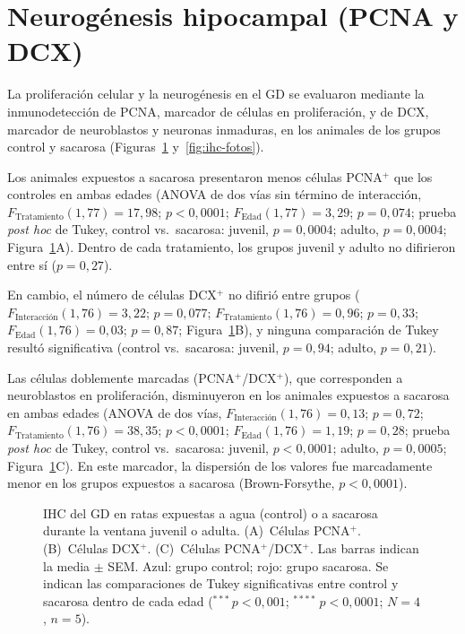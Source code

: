 \FloatBarrier
\section{Neurogénesis hipocampal (PCNA y DCX)}\label{sec:res-neurogenesis}

La proliferación celular y la neurogénesis en el GD se evaluaron mediante la inmunodetección de PCNA, marcador de células en proliferación, y de DCX, marcador de neuroblastos y neuronas inmaduras, en los animales de los grupos control y sacarosa (Figuras~\ref{fig:ihc} y~\ref{fig:ihc-fotos}).

Los animales expuestos a sacarosa presentaron menos células PCNA$^{+}$ que los controles en ambas edades (ANOVA de dos vías sin término de interacción, $F_{\text{Tratamiento}}(1, 77) = 17{,}98$; $p < 0{,}0001$; $F_{\text{Edad}}(1, 77) = 3{,}29$; $p = 0{,}074$; prueba \textit{post hoc} de Tukey, control vs.\ sacarosa: juvenil, $p = 0{,}0004$; adulto, $p = 0{,}0004$; Figura~\ref{fig:ihc}A). Dentro de cada tratamiento, los grupos juvenil y adulto no difirieron entre sí ($p = 0{,}27$).

En cambio, el número de células DCX$^{+}$ no difirió entre grupos ($F_{\text{Interacción}}(1, 76) = 3{,}22$; $p = 0{,}077$; $F_{\text{Tratamiento}}(1, 76) = 0{,}96$; $p = 0{,}33$; $F_{\text{Edad}}(1, 76) = 0{,}03$; $p = 0{,}87$; Figura~\ref{fig:ihc}B), y ninguna comparación de Tukey resultó significativa (control vs.\ sacarosa: juvenil, $p = 0{,}94$; adulto, $p = 0{,}21$).

Las células doblemente marcadas (PCNA$^{+}$/DCX$^{+}$), que corresponden a neuroblastos en proliferación, disminuyeron en los animales expuestos a sacarosa en ambas edades (ANOVA de dos vías, $F_{\text{Interacción}}(1, 76) = 0{,}13$; $p = 0{,}72$; $F_{\text{Tratamiento}}(1, 76) = 38{,}35$; $p < 0{,}0001$; $F_{\text{Edad}}(1, 76) = 1{,}19$; $p = 0{,}28$; prueba \textit{post hoc} de Tukey, control vs.\ sacarosa: juvenil, $p < 0{,}0001$; adulto, $p = 0{,}0005$; Figura~\ref{fig:ihc}C). En este marcador, la dispersión de los valores fue marcadamente menor en los grupos expuestos a sacarosa (Brown-Forsythe, $p < 0{,}0001$).

\begin{figure}[htbp]
  \centering
  \caption[IHC del GD (PCNA y DCX)]{IHC del GD en ratas expuestas a agua (control) o a sacarosa durante la ventana juvenil o adulta. (A)~Células PCNA$^{+}$. (B)~Células DCX$^{+}$. (C)~Células PCNA$^{+}$/DCX$^{+}$. Las barras indican la media $\pm$ SEM. Azul: grupo control; rojo: grupo sacarosa. Se indican las comparaciones de Tukey significativas entre control y sacarosa dentro de cada edad ($^{***}\,p < 0{,}001$; $^{****}\,p < 0{,}0001$; $N = 4$, $n = 5$).}
  \label{fig:ihc}
\end{figure}

